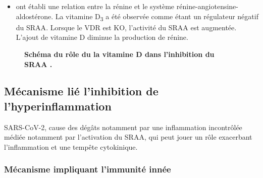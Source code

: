 \documentclass[
  a4paper,
  DIV=11,
  numbers=noendperiod,
  listof=totoc]{scrreprt}
\providecommand{\tightlist}{%
  \setlength{\itemsep}{0pt}\setlength{\parskip}{0pt}}\usepackage{longtable,booktabs,array}
\begin{document}
\begin{itemize}
\tightlist
\item
  \textcite{Li.2002} ont établi une relation entre la rénine et le
  système rénine-angiotensine-aldostérone. La vitamine
  D\textsubscript{3} a été observée comme étant un régulateur négatif du
  \ac{SRAA}. Lorsque le VDR est KO, l'activité du SRAA est augmentée.
  L'ajout de vitamine D diminue la production de rénine.
\end{itemize}

\begin{figure}


\caption[Schéma du rôle du la vitamine D dans l'inhibition du
SRAA.]{\label{fig-vd-ras}\textbf{Schéma du rôle du la vitamine D dans
l'inhibition du SRAA \autocite{Borsche.2021}.}}

\end{figure}%

\subsection{Mécanisme lié l'inhibition de
l'hyperinflammation}\label{muxe9canisme-liuxe9-linhibition-de-lhyperinflammation}

SARS-CoV-2, cause des dégâts notamment par une inflammation incontrôlée
médiée notamment par l'activation du SRAA, qui peut jouer un rôle
exacerbant l'inflammation et une tempête cytokinique.

\subsubsection{Mécanisme impliquant l'immunité
innée}\label{muxe9canisme-impliquant-limmunituxe9-innuxe9e}
\end{document}
